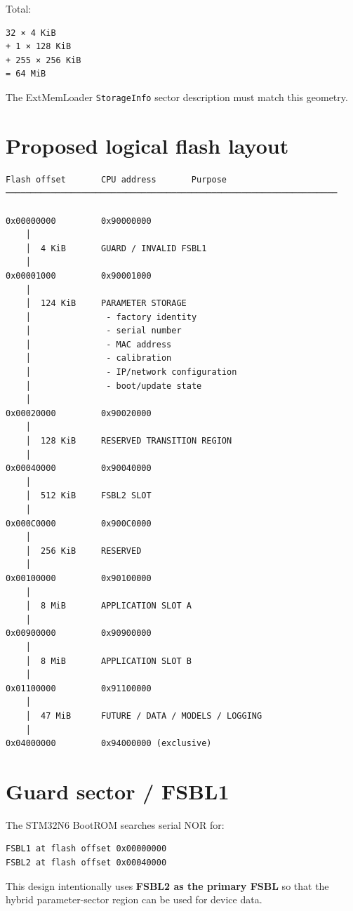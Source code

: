 \documentclass[10pt,a4paper,oneside]{report}
\begin{document}
Total:

\begin{verbatim}
32 × 4 KiB
+ 1 × 128 KiB
+ 255 × 256 KiB
= 64 MiB
\end{verbatim}

The ExtMemLoader \texttt{StorageInfo} sector description must match this geometry.

\section{Proposed logical flash layout}\label{wiki-reference-flash-layout-proposal--3-proposed-logical-flash-layout}

\begin{verbatim}
Flash offset       CPU address       Purpose
──────────────────────────────────────────────────────────────────

0x00000000         0x90000000
    │
    │  4 KiB       GUARD / INVALID FSBL1
    │
0x00001000         0x90001000
    │
    │  124 KiB     PARAMETER STORAGE
    │               - factory identity
    │               - serial number
    │               - MAC address
    │               - calibration
    │               - IP/network configuration
    │               - boot/update state
    │
0x00020000         0x90020000
    │
    │  128 KiB     RESERVED TRANSITION REGION
    │
0x00040000         0x90040000
    │
    │  512 KiB     FSBL2 SLOT
    │
0x000C0000         0x900C0000
    │
    │  256 KiB     RESERVED
    │
0x00100000         0x90100000
    │
    │  8 MiB       APPLICATION SLOT A
    │
0x00900000         0x90900000
    │
    │  8 MiB       APPLICATION SLOT B
    │
0x01100000         0x91100000
    │
    │  47 MiB      FUTURE / DATA / MODELS / LOGGING
    │
0x04000000         0x94000000 (exclusive)
\end{verbatim}

\section{Guard sector / FSBL1}\label{wiki-reference-flash-layout-proposal--4-guard-sector--fsbl1}

The STM32N6 BootROM searches serial NOR for:

\begin{verbatim}
FSBL1 at flash offset 0x00000000
FSBL2 at flash offset 0x00040000
\end{verbatim}

This design intentionally uses \textbf{FSBL2 as the primary FSBL} so that the hybrid parameter-sector region can be used for device data.
\end{document}
